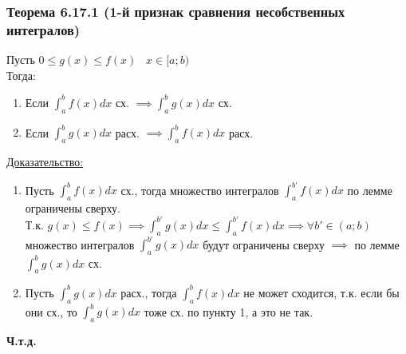 \documentclass[12pt]{article}
\begin{document}
    \subsubsection*{Теорема 6.17.1 (1-й признак сравнения несобственных интегралов)}\label{th:6.17.1}
    Пусть $0\leq g(x) \leq f(x) \;\;\; x\in [a;b)$\\
    Тогда:
    \begin{enumerate}
        \item Если $\int_{a}^{b}f(x)dx$ сх. $\implies \int_{a}^{b}g(x)dx$ сх.
        \item Если $\int_{a}^{b}g(x)dx$ расх. $\implies \int_{a}^{b}f(x)dx$ расх.
    \end{enumerate}
    \underline{Доказательство:}
    \begin{adjustwidth}{1.5em}{1.5em}
        \begin{enumerate}
            \item Пусть $\int_{a}^{b}f(x)dx$ сх., тогда множество интегралов $\int_{a}^{b'}f(x)dx$ по лемме ограничены сверху.\\
            Т.к. $g(x) \leq f(x) \implies \int_{a}^{b'}g(x)dx \leq \int_{a}^{b'}f(x)dx \implies \forall b' \in (a;b)$ множество интегралов $\int_{a}^{b'}g(x)dx$ будут ограничены сверху $\implies$ по лемме $\int_{a}^{b}g(x)dx$ сх.
            \item Пусть $\int_{a}^{b}g(x)dx$ расх., тогда $\int_{a}^{b}f(x)dx$ не может сходится, т.к. если бы они сх., то $\int_{a}^{b}g(x)dx$ тоже сх. по пункту 1, а это не так.
        \end{enumerate}
        \begin{center}
            \textbf{Ч.т.д.}
        \end{center}
    \end{adjustwidth}
\end{document}
